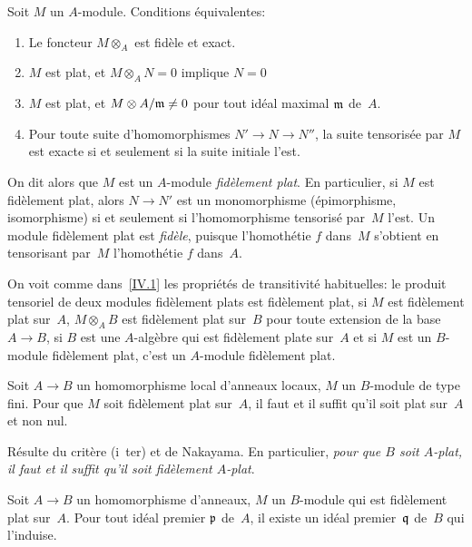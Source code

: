 \begin{proposition}
\label{IV.2.1}
Soit $M$ un $A$-module. Conditions \'equivalentes:
\begin{enumerate}
\item[(i)] Le foncteur $M \otimes_{A}$ est fid\`ele et exact.
\item[(i~bis)]
$M$ est plat, et $M \otimes_{A} N=0$ implique $N=0$
\item[(i~ter)] $M$ est plat, et $M \otimes A/\mathfrak{m} \neq 0$ pour
tout id\'eal maximal $\mathfrak{m}$ de~$A$.
\item[(ii)] Pour toute suite d'homomorphismes $N' \to N \to N''$, la
suite tensoris\'ee par $M$ est exacte si et seulement si la suite
initiale l'est.
\end{enumerate}
\end{proposition}

On dit alors que $M$ est un $A$-module \emph{fidèlement plat}.
En particulier, si $M$ est fid\`element plat, alors $N \to N'$ est
un monomorphisme (\'epimorphisme, isomorphisme) si et seulement si
l'homomorphisme tensoris\'e par~$M$ l'est. Un module fid\`element
plat est \emph{fidèle}, puisque l'homoth\'etie $f$ dans~$M$
s'obtient en tensorisant par~$M$ l'homoth\'etie $f$ dans~$A$.

On voit comme
dans~\ref{IV.1}
les propri\'et\'es de
transitivit\'e habituelles: le produit tensoriel de deux modules
fid\`element plats est fid\`element plat, si $M$ est
fid\`element plat sur~$A$, $M \otimes_{A}B$ est fid\`element plat
sur~$B$ pour toute extension de la base $A \to B$, si $B$ est une
$A$-alg\`ebre qui est fid\`element plate sur~$A$ et si $M$ est un
$B$-module fid\`element plat, c'est un $A$-module fid\`element
plat.

\begin{corollaire}
\label{IV.2.2}
Soit $A \to B$ un homomorphisme local d'anneaux locaux, $M$ un
$B$-module de type fini. Pour que $M$ soit fid\`element plat
sur~$A$, il faut et il suffit qu'il soit plat sur~$A$ et non nul.
\end{corollaire}

R\'esulte du crit\`ere (i~ter) et de Nakayama. En particulier,
\emph{pour que $B$ soit $A$-plat, il faut et il suffit qu'il soit
fidèlement $A$-plat}.

\begin{proposition}
\label{IV.2.3}
Soit $A \to B$ un homomorphisme d'anneaux, $M$ un $B$-module qui est
fid\`element plat sur~$A$. Pour tout id\'eal premier $\mathfrak{p}$
de~$A$, il existe un id\'eal premier~$\mathfrak{q}$ de~$B$ qui
l'induise.
\end{proposition}

